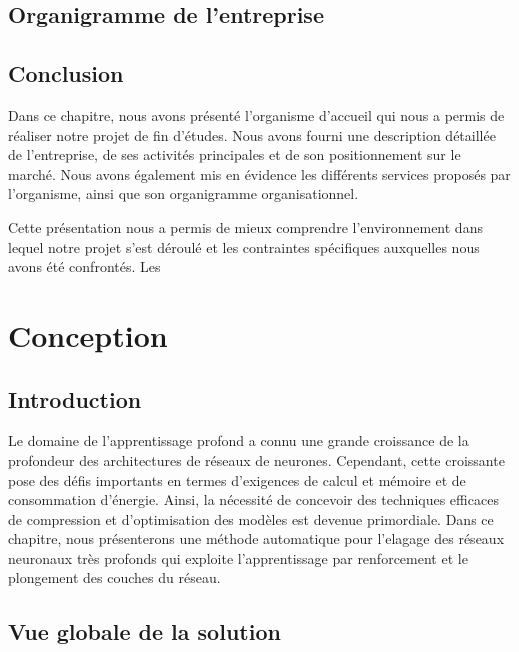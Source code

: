 \section{Organigramme de l'entreprise}
\section{Conclusion}
Dans ce chapitre, nous avons présenté l’organisme d’accueil qui nous a permis de réaliser notre projet de fin d’études. Nous avons fourni une description détaillée de l’entreprise, de ses activités principales et de son positionnement sur le marché. Nous avons également mis en évidence les différents services proposés par l’organisme, ainsi que son organigramme organisationnel.

Cette présentation nous a permis de mieux comprendre l’environnement dans lequel notre projet s’est déroulé et les contraintes spécifiques auxquelles nous avons été confrontés. Les 











\chapter{Conception}


\section{Introduction}
Le domaine de l'apprentissage profond a connu une grande croissance de la profondeur des architectures de réseaux de neurones. Cependant, cette croissante pose des défis importants en termes d'exigences de calcul et mémoire et de consommation d'énergie. Ainsi, la nécessité de concevoir des techniques efficaces de compression et d'optimisation des modèles est devenue primordiale. Dans ce chapitre, nous présenterons une méthode automatique pour l'elagage des réseaux neuronaux très profonds qui exploite l'apprentissage par renforcement et le plongement des couches du réseau.

\section{Vue globale de la solution}



